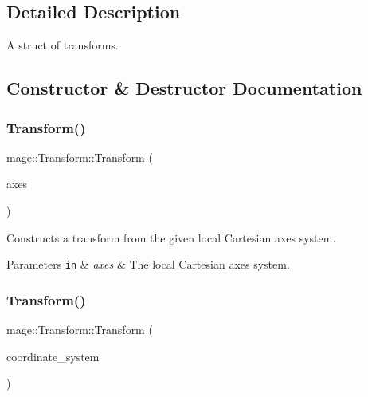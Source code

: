 \subsection{Detailed Description}
A struct of transforms. 

\subsection{Constructor \& Destructor Documentation}
\hypertarget{structmage_1_1_transform_a1a4624639a7da3608738f52b8cfc6bf3}{}\label{structmage_1_1_transform_a1a4624639a7da3608738f52b8cfc6bf3} 
\subsubsection{\texorpdfstring{Transform()}{Transform()}\hspace{0.1cm}{\footnotesize\ttfamily [1/4]}}
{\footnotesize\ttfamily mage\+::\+Transform\+::\+Transform (\begin{DoxyParamCaption}\item[{const \hyperlink{structmage_1_1_cartesian_axes_system}{Cartesian\+Axes\+System} \&}]{axes }\end{DoxyParamCaption})}

Constructs a transform from the given local Cartesian axes system.


\begin{DoxyParams}[1]{Parameters}
\mbox{\tt in}  & {\em axes} & The local Cartesian axes system. \\
\hline
\end{DoxyParams}
\hypertarget{structmage_1_1_transform_a15966913f9d2f02f29da116637fc3bff}{}\label{structmage_1_1_transform_a15966913f9d2f02f29da116637fc3bff} 
\subsubsection{\texorpdfstring{Transform()}{Transform()}\hspace{0.1cm}{\footnotesize\ttfamily [2/4]}}
{\footnotesize\ttfamily mage\+::\+Transform\+::\+Transform (\begin{DoxyParamCaption}\item[{const \hyperlink{structmage_1_1_cartesian_coordinate_system}{Cartesian\+Coordinate\+System} \&}]{coordinate\+\_\+system }\end{DoxyParamCaption})}

